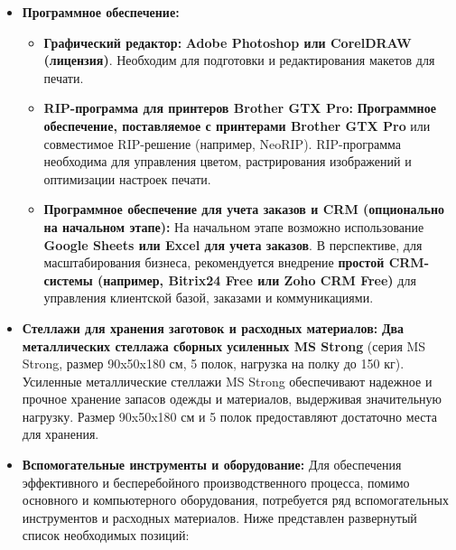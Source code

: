 \begin{itemize}
\begin{itemize}
        \end{itemize}
    \item \textbf{Программное обеспечение:}
        \begin{itemize}
            \item \textbf{Графический редактор:} \textbf{Adobe Photoshop или CorelDRAW (лицензия)}.  Необходим для подготовки и редактирования макетов для печати.
            \item \textbf{RIP-программа для принтеров Brother GTX Pro:} \textbf{Программное обеспечение, поставляемое с принтерами Brother GTX Pro} или совместимое RIP-решение (например, NeoRIP).  RIP-программа необходима для управления цветом, растрирования изображений и оптимизации настроек печати.
            \item \textbf{Программное обеспечение для учета заказов и CRM (опционально на начальном этапе):}  На начальном этапе возможно использование \textbf{Google Sheets или Excel для учета заказов}.  В перспективе, для масштабирования бизнеса, рекомендуется внедрение \textbf{простой CRM-системы (например, Bitrix24 Free или Zoho CRM Free)} для управления клиентской базой, заказами и коммуникациями.
        \end{itemize}
    \item \textbf{Стеллажи для хранения заготовок и расходных материалов:} \textbf{Два металлических стеллажа сборных усиленных MS Strong} (серия MS Strong, размер 90x50x180 см, 5 полок, нагрузка на полку до 150 кг).  Усиленные металлические стеллажи MS Strong обеспечивают надежное и прочное хранение запасов одежды и материалов, выдерживая значительную нагрузку.  Размер 90x50x180 см и 5 полок предоставляют достаточно места для хранения.
    \item \textbf{Вспомогательные инструменты и оборудование:}  Для обеспечения эффективного и бесперебойного производственного процесса, помимо основного и компьютерного оборудования, потребуется ряд вспомогательных инструментов и расходных материалов.  Ниже представлен развернутый список необходимых позиций:


\end{itemize}
